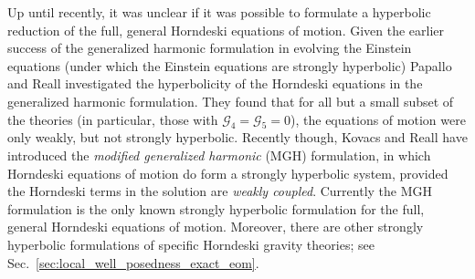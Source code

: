 \documentclass{ws-ijmpd}
\begin{document}
Up until recently, it was unclear if it was possible to
formulate a hyperbolic reduction of the full, 
general Horndeski equations of motion.
Given the earlier success of the generalized harmonic
formulation in evolving the Einstein 
equations\cite{Garfinkle:2001ni,Pretorius:2004jg,Pretorius:2005gq,Pretorius:2006tp}
(under which the Einstein equations are strongly hyperbolic\cite{Friedrich:1996hq})
Papallo and Reall investigated the hyperbolicity of the
Horndeski equations in the generalized harmonic formulation.
They found that for all but a small subset of the theories
(in particular, those with $\mathcal{G}_4=\mathcal{G}_5=0$),
the equations of motion were only weakly, but not strongly
hyperbolic\cite{Papallo:2017qvl,Papallo:2017ddx}.
Recently though, Kovacs and Reall have introduced the
\emph{modified generalized harmonic} (MGH) formulation, in which 
Horndeski equations of motion do form a 
strongly hyperbolic system\cite{Kovacs:2020pns,Kovacs:2020ywu}, provided
the Horndeski terms in the solution are \emph{weakly coupled}.
Currently the MGH formulation is the
only known strongly hyperbolic formulation for the 
full, general Horndeski equations of motion.
Moreover, there are other strongly hyperbolic formulations of
specific Horndeski gravity theories;  
see Sec.~\ref{sec:local_well_posedness_exact_eom}.

\end{document}
